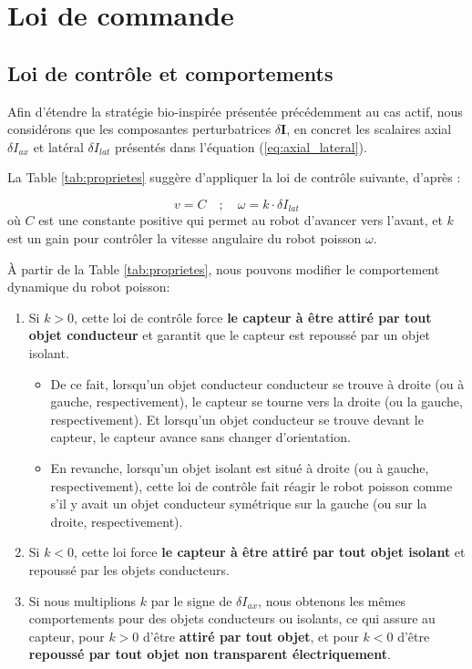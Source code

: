 \section{Loi de commande} 
\subsection{Loi de contrôle et comportements} \label{sec:controle}
Afin d'étendre la stratégie bio-inspirée présentée précédemment au cas actif, nous considérons que les composantes perturbatrices $\delta \mathbf{I}$, en concret les scalaires axial $\delta I_{ax}$ et latéral $\delta I_{lat}$ présentés dans l'équation (\ref{eq:axial_lateral}).

La Table \ref{tab:proprietes} suggère d'appliquer la loi de contrôle suivante, d'après \cite{Boyer2013}: 

\begin{equation}
    v = C \quad ; \quad \omega = k \cdot \delta I_{lat}
\end{equation}
où $C$ est une constante positive qui permet au robot d'avancer vers l'avant, et $k$ est un gain pour contrôler la vitesse angulaire du robot poisson $\omega$. 

À partir de la Table \ref{tab:proprietes}, nous pouvons modifier le comportement dynamique du robot poisson: 
\begin{enumerate} [label=(\alph*), ref=(3.1.\alph*)]
    \item Si $k > 0$, cette loi de contrôle force \textbf{le capteur à être attiré par tout objet conducteur} et garantit que le capteur est repoussé par un objet isolant. \label{item:a}
    \begin{itemize}
        \item De ce fait, lorsqu'un objet conducteur conducteur se trouve à droite (ou à gauche, respectivement), le capteur se tourne vers la droite (ou la gauche, respectivement). Et lorsqu'un objet conducteur se trouve devant le capteur, le capteur avance sans changer d'orientation.
        \item En revanche, lorsqu'un objet isolant est situé à droite (ou à gauche, respectivement), cette loi de contrôle fait réagir le robot poisson comme s'il y avait un objet conducteur symétrique sur la gauche (ou sur la droite, respectivement).
    \end{itemize}
    \item \label{item:b} Si $k < 0$, cette loi force \textbf{le capteur à être attiré par tout objet isolant} et repoussé par les objets conducteurs. 
    \vspace{0.5cm}
    \item Si nous multiplions $k$ par le signe de $\delta I_{ax}$, nous obtenons les mêmes comportements pour des objets conducteurs ou isolants, ce qui assure au capteur, pour $k > 0$ d'être \textbf{attiré par tout objet}, et pour $k < 0$ d'être \textbf{repoussé par tout objet non transparent électriquement}. \label{item:c}
\end{enumerate}
\newpage
